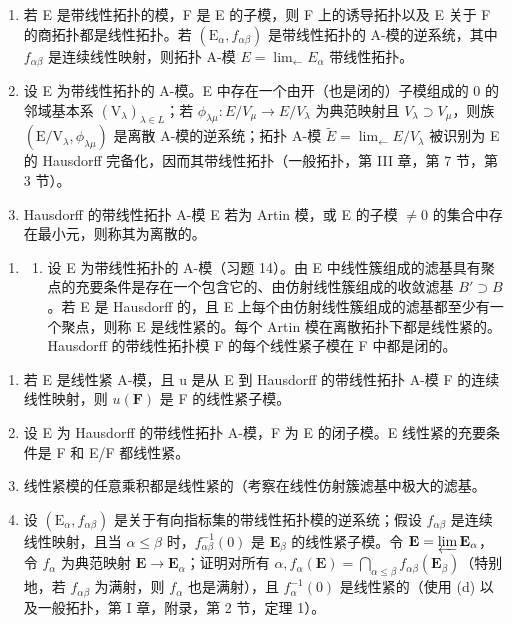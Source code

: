 \begin{enumerate}
\def\labelenumi{(\alph{enumi})}
\item
  若 E 是带线性拓扑的模，F 是 E 的子模，则 F 上的诱导拓扑以及 E 关于 F 的商拓扑都是线性拓扑。若 \((\mathrm{E}_{\alpha}, f_{\alpha\beta})\) 是带线性拓扑的 A-模的逆系统，其中 \(f_{\alpha\beta}\) 是连续线性映射，则拓扑 A-模 \(E = \lim_{\leftarrow} E_{\alpha}\) 带线性拓扑。
\item
  设 E 为带线性拓扑的 A-模。E 中存在一个由开（也是闭的）子模组成的 0 的邻域基本系 \((\mathrm{V}_{\lambda})_{\lambda \in L}\)；若 \(\phi_{\lambda\mu}: E/V_{\mu} \to E/V_{\lambda}\) 为典范映射且 \(V_{\lambda} \supset V_{\mu}\)，则族 \((\mathrm{E}/\mathrm{V}_{\lambda}, \phi_{\lambda\mu})\) 是离散 A-模的逆系统；拓扑 A-模 \(\tilde{E} = \lim_{\leftarrow} E/V_{\lambda}\) 被识别为 E 的 Hausdorff 完备化，因而其带线性拓扑（一般拓扑，第 III 章，第 7 节，第 3 节）。
\item
  Hausdorff 的带线性拓扑 A-模 E 若为 Artin 模，或 E 的子模 \(\neq0\) 的集合中存在最小元，则称其为离散的。
\end{enumerate}

\begin{enumerate}
\def\labelenumi{\arabic{enumi}.}
\setcounter{enumi}{14}
\tightlist
\item
  \begin{enumerate}
  \def\labelenumii{(\alph{enumii})}
  \tightlist
  \item
    设 E 为带线性拓扑的 A-模（习题 14）。由 E 中线性簇组成的滤基具有聚点的充要条件是存在一个包含它的、由仿射线性簇组成的收敛滤基 \(B' \supset B\)。若 E 是 Hausdorff 的，且 E 上每个由仿射线性簇组成的滤基都至少有一个聚点，则称 E 是线性紧的。每个 Artin 模在离散拓扑下都是线性紧的。Hausdorff 的带线性拓扑模 F 的每个线性紧子模在 F 中都是闭的。
  \end{enumerate}
\end{enumerate}

\begin{enumerate}
\def\labelenumi{(\alph{enumi})}
\setcounter{enumi}{1}
\item
  若 E 是线性紧 A-模，且 u 是从 E 到 Hausdorff 的带线性拓扑 A-模 F 的连续线性映射，则 \(u(\mathbf{F})\) 是 F 的线性紧子模。
\item
  设 E 为 Hausdorff 的带线性拓扑 A-模，F 为 E 的闭子模。E 线性紧的充要条件是 F 和 E/F 都线性紧。
\item
  线性紧模的任意乘积都是线性紧的（考察在线性仿射簇滤基中极大的滤基。
\item
  设 \((\mathrm{E}_{\alpha}, f_{\alpha \beta})\) 是关于有向指标集的带线性拓扑模的逆系统；假设 \(f_{\alpha \beta}\) 是连续线性映射，且当 \(\alpha \leqslant \beta\) 时，\(f_{\alpha \beta}^{-1}(0)\) 是 \(\mathbf{E}_{\beta}\) 的线性紧子模。令 \(\mathbf{E} = \varprojlim \mathbf{E}_{\alpha}\)，令 \(f_{\alpha}\) 为典范映射 \(\mathbf{E} \to \mathbf{E}_{\alpha}\)；证明对所有 \(\alpha, f_{\alpha}(\mathbf{E}) = \bigcap_{\alpha \leqslant \beta} f_{\alpha \beta}(\mathbf{E}_{\beta})\)（特别地，若 \(f_{\alpha \beta}\) 为满射，则 \(f_{\alpha}\) 也是满射），且 \(f_{\alpha}^{-1}(0)\) 是线性紧的（使用 (d) 以及一般拓扑，第 I 章，附录，第 2 节，定理 1）。
\end{enumerate}


